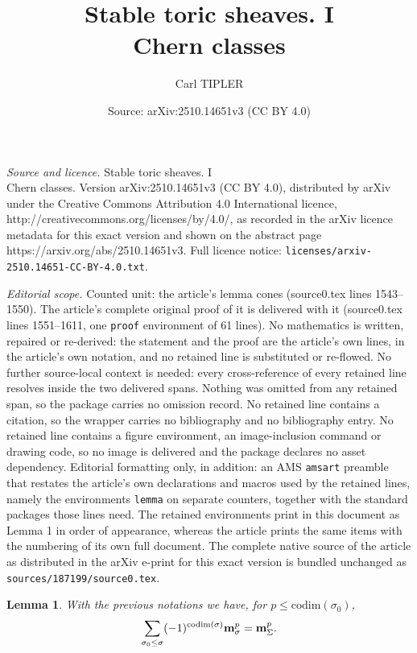 \documentclass[10pt,a4paper]{amsart}
\title{Stable toric sheaves. I \\ Chern classes}
\author{Carl TIPLER}
\date{Source: arXiv:2510.14651v3 (CC BY 4.0)}
\newtheorem{lemma}{Lemma}
\def\codim{\mathrm{codim}}
\def\um{{\bf m}}
\begin{document}
\maketitle

\noindent\emph{Source and licence.} Stable toric sheaves. I \\ Chern classes. Version arXiv:2510.14651v3 (CC BY 4.0), distributed by arXiv under the Creative Commons Attribution 4.0 International licence, http://creativecommons.org/licenses/by/4.0/, as recorded in the arXiv licence metadata for this exact version and shown on the abstract page https://arxiv.org/abs/2510.14651v3. Full licence notice: \texttt{licenses/arxiv-2510.14651-CC-BY-4.0.txt}.\par\smallskip

\noindent\textit{Editorial scope.} Counted unit: the article's lemma cones (source0.tex lines 1543--1550). The article's complete original proof of it is delivered with it (source0.tex lines 1551--1611, one \texttt{proof} environment of 61 lines). No mathematics is written, repaired or re-derived: the statement and the proof are the article's own lines, in the article's own notation, and no retained line is substituted or re-flowed.  No further source-local context is needed: every cross-reference of every retained line resolves inside the two delivered spans.  Nothing was omitted from any retained span, so the package carries no omission record.  No retained line contains a citation, so the wrapper carries no bibliography and no bibliography entry.  No retained line contains a figure environment, an image-inclusion command or drawing code, so no image is delivered and the package declares no asset dependency.  Editorial formatting only, in addition: an AMS \texttt{amsart} preamble that restates the article's own declarations and macros used by the retained lines, namely the environments \texttt{lemma} on separate counters, together with the standard packages those lines need.  The retained environments print in this document as Lemma 1 in order of appearance, whereas the article prints the same items with the numbering of its own full document.  The complete native source of the article as distributed in the arXiv e-print for this exact version is bundled unchanged as \texttt{sources/187199/source0.tex}.
 \begin{lemma}
  \label{lem:sum minus one on cones}
  With the previous notations we have, for $p\leq \codim(\sigma_0)$,
\begin{equation}
 \label{eq:summinusonemsigma}
\sum_{\sigma_0\leq\sigma} (-1)^{\codim(\sigma)}\um_\sigma^p=\um_\Sigma^p.
\end{equation}
 \end{lemma}
\end{document}
